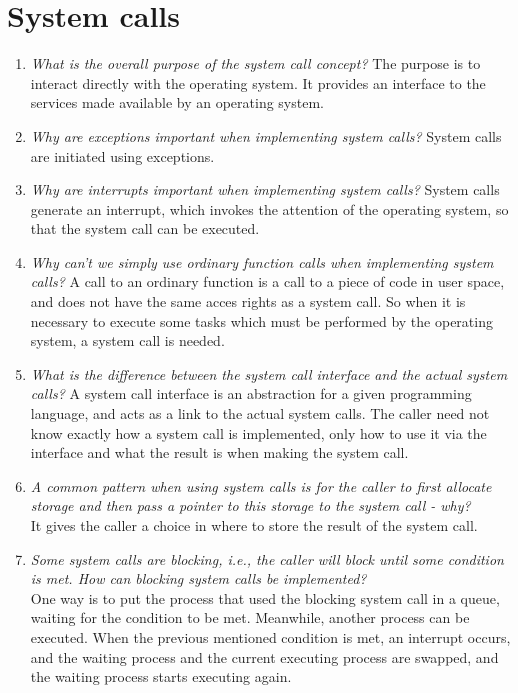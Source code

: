 \documentclass[a4paper]{article}
\begin{document}
\section{System calls}
\begin{enumerate}
  \item \textit{What is the overall purpose of the system call concept? }
    The purpose is to interact directly with the operating system. It provides an interface to the services made available by an operating system.
  \item \textit{Why are exceptions important when implementing system calls?}
    System calls are initiated using exceptions. 
  \item \textit{Why are interrupts important when implementing system calls?}
    System calls generate an interrupt, which invokes the attention of the operating system, so that the system call can be executed.
  \item \textit{Why can't we simply use ordinary function calls when implementing system calls?}
    A call to an ordinary function is a call to a piece of code in user space, and does not have the same acces rights as a system call. So when it is necessary to execute some tasks which must be performed by the operating system, a system call is needed.
  \item \textit{What is the difference between the system call interface and the actual system calls?}
    A system call interface is an abstraction for a given programming language, and acts as a link to the actual system calls. The caller need not know exactly how a system call is implemented, only how to use it via the interface and what the result is when making the system call.
  \item \textit{A common pattern when using system calls is for the caller to first allocate storage and then pass a pointer to this storage to the system call - why? } \\ 
    It gives the caller a choice in where to store the result of the system call.
  \item \textit{Some system calls are blocking, i.e., the caller will block until some condition is met. How can blocking system calls be implemented?} \\
   One way is to put the process that used the blocking system call in a queue, waiting for the condition to be met. Meanwhile, another process can be executed. When the previous mentioned condition is met, an interrupt occurs, and the waiting process and the current executing process are swapped, and the waiting process starts executing again. 
  
\end{enumerate}
\end{document}
